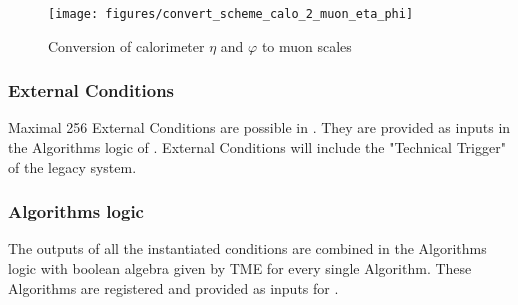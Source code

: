 \begin{figure}[htb]
\centering
\texttt{[image: figures/convert\_scheme\_calo\_2\_muon\_eta\_phi]}
\caption{Conversion of calorimeter $\eta$ and $\varphi$ to muon scales}
\label{fig:gtl:convert_scheme_calo_2_muon_eta_phi}
\end{figure}

\clearpage

\subsubsection{External Conditions}
\label{sec:gtl:external_conditions}
Maximal 256 External Conditions are possible in \gt. They are provided as inputs in the Algorithms logic of \ugtl.
External Conditions will include the "Technical Trigger" of the legacy system.

\subsubsection{Algorithms logic}
\label{sec:gtl:algorithms_logic}

The outputs of all the instantiated conditions are combined in the Algorithms logic with boolean algebra given by TME for every single Algorithm. These Algorithms are registered and provided as inputs for \fdl.

\clearpage
